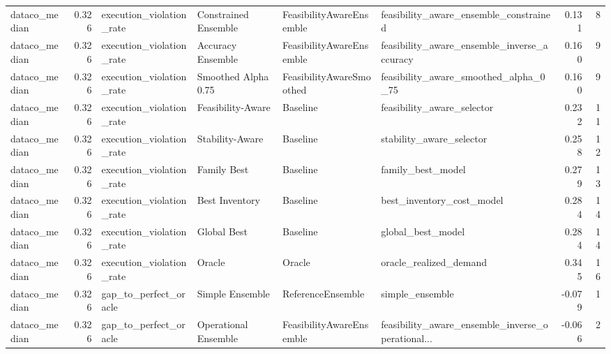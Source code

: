 \begin{table}
{\begin{tabular}{lrllllrr}
 dataco\_median &             0.326 &    execution\_violation\_rate &  Constrained Ensemble &  FeasibilityAwareEnsemble &             feasibility\_aware\_ensemble\_constrained &         0.131 &               8 \\
 dataco\_median &             0.326 &    execution\_violation\_rate &     Accuracy Ensemble &  FeasibilityAwareEnsemble &        feasibility\_aware\_ensemble\_inverse\_accuracy &         0.160 &               9 \\
 dataco\_median &             0.326 &    execution\_violation\_rate &   Smoothed Alpha 0.75 &  FeasibilityAwareSmoothed &              feasibility\_aware\_smoothed\_alpha\_0\_75 &         0.160 &               9 \\
 dataco\_median &             0.326 &    execution\_violation\_rate &     Feasibility-Aware &                  Baseline &                         feasibility\_aware\_selector &         0.232 &              11 \\
 dataco\_median &             0.326 &    execution\_violation\_rate &       Stability-Aware &                  Baseline &                           stability\_aware\_selector &         0.258 &              12 \\
 dataco\_median &             0.326 &    execution\_violation\_rate &           Family Best &                  Baseline &                                  family\_best\_model &         0.279 &              13 \\
 dataco\_median &             0.326 &    execution\_violation\_rate &        Best Inventory &                  Baseline &                          best\_inventory\_cost\_model &         0.284 &              14 \\
 dataco\_median &             0.326 &    execution\_violation\_rate &           Global Best &                  Baseline &                                  global\_best\_model &         0.284 &              14 \\
 dataco\_median &             0.326 &    execution\_violation\_rate &                Oracle &                    Oracle &                             oracle\_realized\_demand &         0.345 &              16 \\
 dataco\_median &             0.326 &       gap\_to\_perfect\_oracle &       Simple Ensemble &         ReferenceEnsemble &                                    simple\_ensemble &        -0.079 &               1 \\
 dataco\_median &             0.326 &       gap\_to\_perfect\_oracle &  Operational Ensemble &  FeasibilityAwareEnsemble &  feasibility\_aware\_ensemble\_inverse\_operational... &        -0.066 &               2 \\

\end{tabular}}
\end{table}

